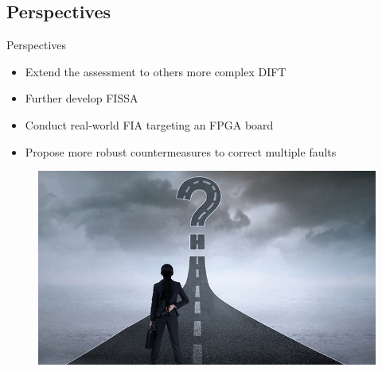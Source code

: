 \subsection{Perspectives}
\begin{frame}{Perspectives}
    \begin{block}{}
        \begin{itemize}
            [triangle]
            \item Extend the assessment to others more complex DIFT
            \item Further develop FISSA
            \item Conduct real-world FIA targeting an FPGA board
            \item Propose more robust countermeasures to correct multiple faults
        \end{itemize}
    \end{block}

    \begin{figure}
        \centering
        \includegraphics[height=.25\textheight]{src/6_conclusion/img/perspectives.jpg}
    \end{figure}
\end{frame}

